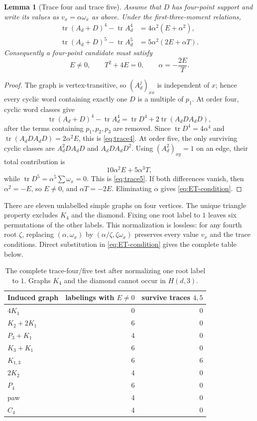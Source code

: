 \documentclass[11pt,reqno]{amsart}
\newtheorem{lemma}[theorem]{Lemma}
\theoremstyle{definition}
\theoremstyle{remark}
\DeclareMathOperator{\tr}{tr}
\begin{document}
\begin{lemma}[Trace four and trace five]\label{lem:trace45}
Assume that $D$ has four-point support and write its values as
$v_x=\alpha\omega_x$ as above.  Under the first-three-moment relations,
\begin{align}
 \tr(A_d+D)^4-\tr A_d^4
   &=4\alpha^2(E+\alpha^2),\label{eq:trace4}\\
 \tr(A_d+D)^5-\tr A_d^5
   &=5\alpha^2(2E+\alpha T).\label{eq:trace5}
\end{align}
Consequently a four-point candidate must satisfy
\begin{equation}\label{eq:ET-condition}
 E\neq0,\qquad T^2+4E=0,
 \qquad \alpha=-\frac{2E}{T}.
\end{equation}
\end{lemma}

\begin{proof}
The graph is vertex-transitive, so $(A_d^j)_{xx}$ is independent of $x$;
hence every cyclic word containing exactly one $D$ is a multiple of $p_1$.
 At order four, cyclic word classes give
\[
 \tr(A_d+D)^4-\tr A_d^4
 =\tr D^4+2\tr(A_dD A_dD),
\]
after the terms containing $p_1,p_2,p_3$ are removed.  Since
$\tr D^4=4\alpha^4$ and
$\tr(A_dD A_dD)=2\alpha^2E$, this is \eqref{eq:trace4}.  At order five, the only surviving cyclic
classes are $A_d^2DA_dD$ and $A_dDA_dD^2$.  Using
$(A_d^2)_{xy}=1$ on an edge, their total contribution is
\[
 10\alpha^2E+5\alpha^3T,
\]
while $\tr D^5=\alpha^5\sum\omega_x=0$.  This is
\eqref{eq:trace5}.  If both differences vanish, then
$\alpha^2=-E$, so $E\neq0$, and $\alpha T=-2E$.  Eliminating $\alpha$
gives \eqref{eq:ET-condition}.
\end{proof}

There are eleven unlabelled simple graphs on four vertices.  The unique
triangle property excludes $K_4$ and the diamond.  Fixing one root label to
$1$ leaves six permutations of the other labels.  This normalization is
lossless: for any fourth root $\zeta$, replacing
$(\alpha,\omega_x)$ by $(\alpha/\zeta,\zeta\omega_x)$ preserves every
value $v_x$ and the trace conditions.  Direct substitution in
\eqref{eq:ET-condition} gives the complete table below.

\begin{table}[htbp]
\centering
\caption{The complete trace-four/five test after normalizing one root label
to $1$.  Graphs $K_4$ and the diamond cannot occur in $H(d,3)$.}
\label{tab:four-point}
\begin{tabular}{lrr}
\toprule
Induced graph & labelings with $E\neq0$ & survive traces $4,5$\\
\midrule
$4K_1$       &0&0\\
$K_2+2K_1$   &6&0\\
$P_3+K_1$    &4&0\\
$K_3+K_1$    &6&0\\
$K_{1,3}$    &6&6\\
$2K_2$       &4&0\\
$P_4$        &6&0\\
paw          &4&0\\
$C_4$        &4&0\\
\bottomrule
\end{tabular}
\end{table}
\end{document}
